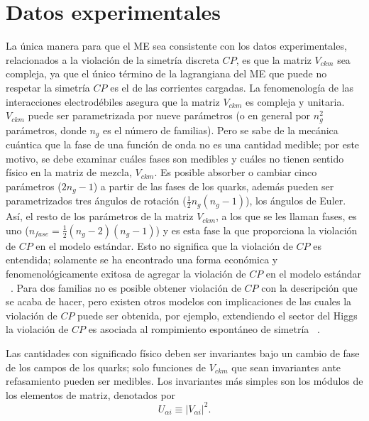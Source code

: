 \section{Datos experimentales}
La \'unica manera para que el ME sea consistente con los datos experimentales, 
relacionados a la violaci\'on de la simetr\'ia discreta $CP$, es que la matriz
$V_{ckm}$ sea compleja, ya que el \'unico t\'ermino de la lagrangiana del ME
que puede no respetar la simetr\'ia $CP$ es el de las corrientes cargadas. 
La fenomenolog\'ia de las interacciones electrod\'ebiles asegura que la matriz 
$V_{ckm}$ es compleja y unitaria. $V_{ckm}$ puede ser parametrizada por nueve 
par\'ametros (o en general por $n^2_g$ par\'ametros, donde $n_g$ es el n\'umero 
de familias). Pero se sabe de la mec\'anica cu\'antica que la fase de una 
funci\'on de onda no es una cantidad medible; por este motivo, se debe examinar
cu\'ales fases son medibles y cu\'ales no tienen sentido f\'isico en la matriz 
de mezcla, $V_{ckm}$. Es posible absorber o cambiar cinco par\'ametros
($2n_g-1$) a partir de las fases de los quarks, adem\'as pueden ser 
parametrizados tres \'angulos de rotaci\'on ($\frac{1}{2}n_g(n_g-1)$), los 
\'angulos de Euler. As\'i, el resto de los par\'ametros de la matriz $V_{ckm}$,
a los que se les llaman fases, es uno ($n_{fase}=\frac{1}{2}(n_g-2)(n_g-1)$) y 
es esta fase la que proporciona la violaci\'on de $CP$ en el modelo est\'andar.
Esto no significa que la violaci\'on de $CP$ es entendida; solamente se ha 
encontrado una forma econ\'omica y fenomenol\'ogicamente exitosa de agregar la
violaci\'on de $CP$ en el modelo est\'andar ~\cite{Big200101}. Para dos familias
no es posible obtener violaci\'on de $CP$ con la descripci\'on que se acaba de
hacer, pero existen otros modelos con implicaciones de las cuales la violaci\'on
de $CP$ puede ser obtenida, por ejemplo, extendiendo el sector del Higgs la
violaci\'on de $CP$ es asociada al rompimiento espont\'aneo de simetr\'ia 
~\cite{Jar198901}.

Las cantidades con significado f\'isico deben ser invariantes bajo un cambio de
fase de los campos de los quarks; solo funciones de $V_{ckm}$ que sean 
invariantes ante refasamiento pueden ser medibles. Los invariantes m\'as simples
son los m\'odulos de los elementos de matriz, denotados por
$$U_{\alpha i}\equiv\left|V_{\alpha i}\right|^2.$$

